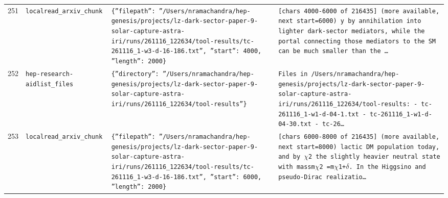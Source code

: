 \documentclass[11pt,a4paper]{article}
\begin{document}
\begin{longtable}{@{}p{}p{}p{}p{}@{}}
251 & \texttt{local}\newline\texttt{read\_\allowbreak{}arxiv\_\allowbreak{}chunk} & \texttt{\{''filepath'':\allowbreak{} ''/\allowbreak{}Users/\allowbreak{}nramachandra/\allowbreak{}hep-genesis/\allowbreak{}projects/\allowbreak{}lz-dark-sector-paper-9-solar-capture-astra-iri/\allowbreak{}runs/\allowbreak{}261116\_\allowbreak{}122634/\allowbreak{}tool-results/\allowbreak{}tc-261116\_\allowbreak{}1-w3-d-16-186.txt'',\allowbreak{} ''start'':\allowbreak{} 4000,\allowbreak{} ''length'':\allowbreak{} 2000\}\allowbreak{}} & \texttt{[chars 4000-6000 of 216435]\allowbreak{} (more available,\allowbreak{} next start=\allowbreak{}6000)\allowbreak{}  y by annihilation into lighter dark-sector mediators,\allowbreak{} while the portal connecting those mediators to the SM can be much smaller than the \ldots{}\allowbreak{}} \\
252 & \texttt{hep-research-aid}\newline\texttt{list\_\allowbreak{}files} & \texttt{\{''directory'':\allowbreak{} ''/\allowbreak{}Users/\allowbreak{}nramachandra/\allowbreak{}hep-genesis/\allowbreak{}projects/\allowbreak{}lz-dark-sector-paper-9-solar-capture-astra-iri/\allowbreak{}runs/\allowbreak{}261116\_\allowbreak{}122634/\allowbreak{}tool-results''\}\allowbreak{}} & \texttt{Files in /\allowbreak{}Users/\allowbreak{}nramachandra/\allowbreak{}hep-genesis/\allowbreak{}projects/\allowbreak{}lz-dark-sector-paper-9-solar-capture-astra-iri/\allowbreak{}runs/\allowbreak{}261116\_\allowbreak{}122634/\allowbreak{}tool-results:\allowbreak{}   - tc-261116\_\allowbreak{}1-w1-d-04-1.txt   - tc-261116\_\allowbreak{}1-w1-d-04-30.txt   - tc-26\ldots{}\allowbreak{}} \\
253 & \texttt{local}\newline\texttt{read\_\allowbreak{}arxiv\_\allowbreak{}chunk} & \texttt{\{''filepath'':\allowbreak{} ''/\allowbreak{}Users/\allowbreak{}nramachandra/\allowbreak{}hep-genesis/\allowbreak{}projects/\allowbreak{}lz-dark-sector-paper-9-solar-capture-astra-iri/\allowbreak{}runs/\allowbreak{}261116\_\allowbreak{}122634/\allowbreak{}tool-results/\allowbreak{}tc-261116\_\allowbreak{}1-w3-d-16-186.txt'',\allowbreak{} ''start'':\allowbreak{} 6000,\allowbreak{} ''length'':\allowbreak{} 2000\}\allowbreak{}} & \texttt{[chars 6000-8000 of 216435]\allowbreak{} (more available,\allowbreak{} next start=\allowbreak{}8000)\allowbreak{}  lactic DM population today,\allowbreak{} and by $\chi$2 the slightly heavier neutral state with massm$\chi$2 =\allowbreak{}m$\chi$1+$\delta$. In the Higgsino and pseudo-Dirac realizatio\ldots{}\allowbreak{}} \\

\end{longtable}
\end{document}
